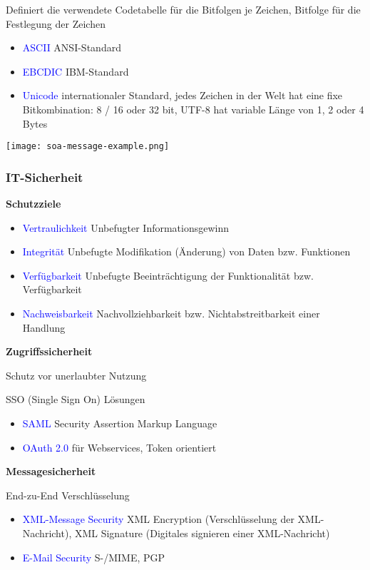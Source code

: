 Definiert die verwendete Codetabelle für die Bitfolgen je Zeichen, Bitfolge für die Festlegung der Zeichen

\begin{itemize}
    \item \textcolor{blue}{ASCII} ANSI-Standard
    \item \textcolor{blue}{EBCDIC} IBM-Standard
    \item \textcolor{blue}{Unicode} internationaler Standard, jedes Zeichen in der Welt hat eine fixe Bitkombination: 8 / 16 oder 32 bit, UTF-8 hat variable Länge von 1, 2 oder 4 Bytes
\end{itemize}

\texttt{[image: soa-message-example.png]}

\subsubsection{IT-Sicherheit}

\textbf{Schutzziele}

\begin{itemize}
    \item \textcolor{blue}{Vertraulichkeit} Unbefugter Informationsgewinn
    \item \textcolor{blue}{Integrität} Unbefugte Modifikation (Änderung) von Daten bzw. Funktionen
    \item \textcolor{blue}{Verfügbarkeit} Unbefugte Beeinträchtigung der Funktionalität bzw. Verfügbarkeit
    \item \textcolor{blue}{Nachweisbarkeit} Nachvollziehbarkeit bzw. Nichtabstreitbarkeit einer Handlung
\end{itemize}
\vspace{10pt}
\textbf{Zugriffssicherheit}

Schutz vor unerlaubter Nutzung

SSO (Single Sign On) Lösungen
\begin{itemize}
    \item \textcolor{blue}{SAML} Security Assertion Markup Language
    \item \textcolor{blue}{OAuth 2.0} für Webservices, Token orientiert
\end{itemize}
\vspace{10pt}
\textbf{Messagesicherheit}

End-zu-End Verschlüsselung

\begin{itemize}
    \item \textcolor{blue}{XML-Message Security} XML Encryption (Verschlüsselung der XML-Nachricht), XML Signature (Digitales signieren einer XML-Nachricht)
    \item \textcolor{blue}{E-Mail Security} S-/MIME, PGP
\end{itemize}



